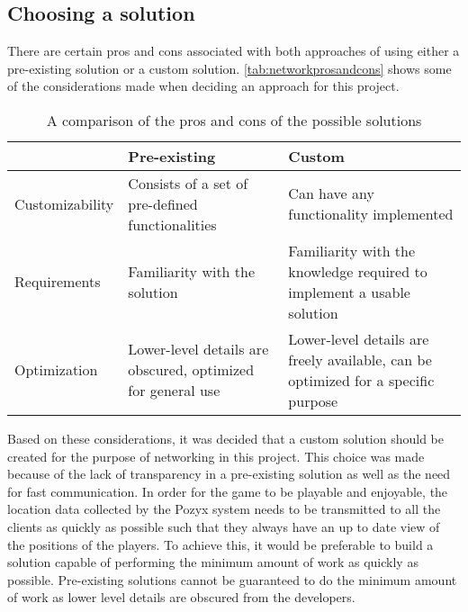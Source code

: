 \subsection{Choosing a solution}
There are certain pros and cons associated with both approaches of using either a pre-existing solution or a custom solution.
\autoref{tab:networkprosandcons} shows some of the considerations made when deciding an approach for this project.
\begin{table}[tbp]
    \begin{tabularx}{\textwidth}{|X|X|X|}
    \hline
                    & Pre-existing                                                & Custom                                                                            \\ \hline
    Customizability & Consists of a set of pre-defined functionalities            & Can have any functionality implemented                                            \\ \hline
    Requirements    & Familiarity with the solution                               & Familiarity with the knowledge required to implement a usable solution            \\ \hline
    Optimization    & Lower-level details are obscured, optimized for general use & Lower-level details are freely available, can be optimized for a specific purpose \\ \hline
    \end{tabularx}
    \caption{A comparison of the pros and cons of the possible solutions}
    \label{tab:networkprosandcons}
\end{table}
Based on these considerations, it was decided that a custom solution should be created for the purpose of networking in this project.
This choice was made because of the lack of transparency in a pre-existing solution as well as the need for fast communication.
In order for the game to be playable and enjoyable, the location data collected by the Pozyx system needs to be transmitted to all the clients as quickly as possible such that they always have an up to date view of the positions of the players.
To achieve this, it would be preferable to build a solution capable of performing the minimum amount of work as quickly as possible.
Pre-existing solutions cannot be guaranteed to do the minimum amount of work as lower level details are obscured from the developers.


